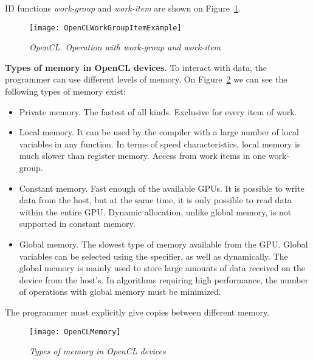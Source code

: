 {ID functions \textit{work-group} and \textit{work-item} are shown on Figure~\ref{OpenCLWorkGroupItemExample:image}.
	\begin{figure}[H]
		\texttt{[image: OpenCLWorkGroupItemExample]}
		\caption{\textit{OpenCL. Operation with work-group and work-item}}
		\label{OpenCLWorkGroupItemExample:image}
	\end{figure}
	\par\textbf{Types of memory in OpenCL devices.} To interact with data, the programmer can use different levels of memory. On Figure~\ref{OpenCLMemory:image}  we can see the following types of memory exist:
	\begin{itemize}
		\item Private memory. The fastest of all kinds. Exclusive for every item of work.
		\item Local memory. It can be used by the compiler with a large number of local variables in any function. In terms of speed characteristics, local memory is much slower than register memory. Access from work items in one work-group.
		\item Constant memory. Fast enough of the available GPUs. It is possible to write data from the host, but at the same time, it is only possible to read data within the entire GPU. Dynamic allocation, unlike global memory, is not supported in constant memory.
		\item Global memory. The slowest type of memory available from the GPU. Global variables can be selected using the specifier, as well as dynamically. The global memory is mainly used to store large amounts of data received on the device from the host’s. In algorithms requiring high performance, the number of operations with global memory must be minimized.
	\end{itemize}	
	The programmer must explicitly give copies between different memory.
	\begin{figure}[H]
		\texttt{[image: OpenCLMemory]}
		\caption{\textit{Types of memory in OpenCL devices}}
		\label{OpenCLMemory:image}
	\end{figure}

}
